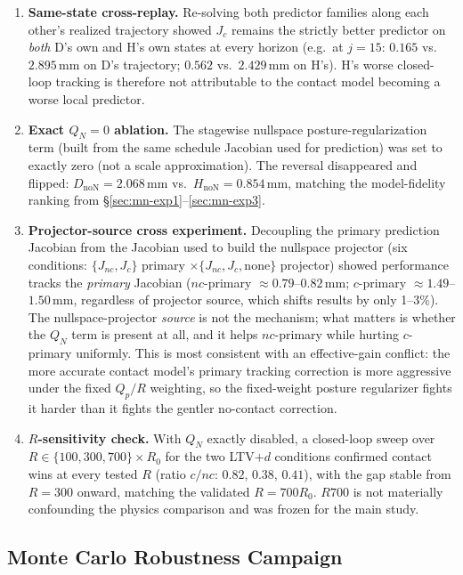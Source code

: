 \documentclass[journal]{IEEEtran}
\begin{document}
\begin{enumerate}
\item \textbf{Same-state cross-replay.} Re-solving both predictor
  families along each other's realized trajectory showed $J_c$ remains
  the strictly better predictor on \emph{both} D's own and H's own
  states at every horizon (e.g.\ at $j{=}15$: $0.165$ vs.\
  $2.895\,\mathrm{mm}$ on D's trajectory; $0.562$ vs.\
  $2.429\,\mathrm{mm}$ on H's). H's worse closed-loop tracking is
  therefore not attributable to the contact model becoming a worse
  local predictor.
\item \textbf{Exact $Q_N=0$ ablation.} The stagewise nullspace
  posture-regularization term (built from the same schedule Jacobian
  used for prediction) was set to exactly zero (not a scale
  approximation). The reversal disappeared and flipped:
  $D_{\mathrm{noN}}=2.068\,\mathrm{mm}$ vs.\
  $H_{\mathrm{noN}}=0.854\,\mathrm{mm}$, matching the model-fidelity
  ranking from \S\ref{sec:mn-exp1}--\ref{sec:mn-exp3}.
\item \textbf{Projector-source cross experiment.} Decoupling the
  primary prediction Jacobian from the Jacobian used to build the
  nullspace projector (six conditions: $\{J_{nc},J_c\}$ primary
  $\times\{J_{nc},J_c,\text{none}\}$ projector) showed performance
  tracks the \emph{primary} Jacobian ($nc$-primary $\approx0.79$--$0.82\,\mathrm{mm}$;
  $c$-primary $\approx1.49$--$1.50\,\mathrm{mm}$, regardless of
  projector source, which shifts results by only 1--3\%). The
  nullspace-projector \emph{source} is not the mechanism; what matters
  is whether the $Q_N$ term is present at all, and it helps
  $nc$-primary while hurting $c$-primary uniformly. This is most
  consistent with an effective-gain conflict: the more accurate
  contact model's primary tracking correction is more aggressive under
  the fixed $Q_p/R$ weighting, so the fixed-weight posture regularizer
  fights it harder than it fights the gentler no-contact correction.
\item \textbf{$R$-sensitivity check.} With $Q_N$ exactly disabled, a
  closed-loop sweep over $R\in\{100,300,700\}\times R_0$ for the two
  LTV$+d$ conditions confirmed contact wins at every tested $R$ (ratio
  $c/nc$: $0.82$, $0.38$, $0.41$), with the gap stable from
  $R{=}300$ onward, matching the validated $R{=}700R_0$. $R700$ is not
  materially confounding the physics comparison and was frozen for the
  main study.
\end{enumerate}

\subsection{Monte Carlo Robustness Campaign}
\label{sec:mn-mc}
\end{document}
